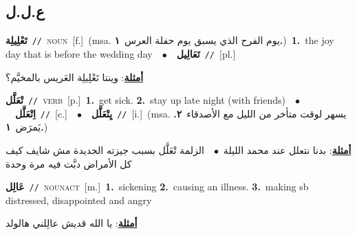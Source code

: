 \documentclass[10pt,a4paper,twoside]{article} %
\begin{document}
\begin{multicols}{2}
\vspace{-3mm}
\subsection*{\color{blue}\foreignlanguage{arabic}{ع.ل.ل}\color{blue}{}} 

{\setlength\topsep{0pt}\textbf{\foreignlanguage{arabic}{تَعْلِيلِة}}\ {\color{gray}\texttt{//}\color{black}}\ \textsc{noun}\ [f.]\ \color{gray}(msa. \foreignlanguage{arabic}{يوم الفرح الذي يسبق يوم حفلة العرس}~\foreignlanguage{arabic}{\textbf{١.}})\color{black}\ \textbf{1.}~the joy day that is before the wedding day\ \ $\bullet$\ \ \setlength\topsep{0pt}\textbf{\foreignlanguage{arabic}{تَعَالِيل}}\ {\color{gray}\texttt{//}\color{black}}\ [pl.]\  \begin{flushright}\color{gray}\foreignlanguage{arabic}{\textbf{\underline{\foreignlanguage{arabic}{أمثلة}}}: وينتا تَعْلِيلِة العَريس بالمخيَّم؟}\end{flushright}\color{black}} \vspace{2mm}

{\setlength\topsep{0pt}\textbf{\foreignlanguage{arabic}{تْعَلَّل}}\ {\color{gray}\texttt{//}\color{black}}\ \textsc{verb}\ [p.]\ \textbf{1.}~get sick.  \textbf{2.}~stay up late night (with friends)\ \ $\bullet$\ \ \setlength\topsep{0pt}\textbf{\foreignlanguage{arabic}{اِتْعَلَّل}}\ {\color{gray}\texttt{//}\color{black}}\ [c.]\ \ $\bullet$\ \ \setlength\topsep{0pt}\textbf{\foreignlanguage{arabic}{يِتْعَلَّل}}\ {\color{gray}\texttt{//}\color{black}}\ [i.]\ \color{gray}(msa. \foreignlanguage{arabic}{يسهر لوقت متأخر من الليل مع الأصدقاء}~\foreignlanguage{arabic}{\textbf{٢.}}  \foreignlanguage{arabic}{يَمرَض}~\foreignlanguage{arabic}{\textbf{١.}})\color{black}\  \begin{flushright}\color{gray}\foreignlanguage{arabic}{\textbf{\underline{\foreignlanguage{arabic}{أمثلة}}}: بدنا نتعلل عند محمد الليلة\ $\bullet$\ \  الزلمة تْعَلَّل بسبب جيزته الجديدة مش شايف كيف كل الأمراض دبَّت فيه مرة وحدة}\end{flushright}\color{black}} \vspace{2mm}

{\setlength\topsep{0pt}\textbf{\foreignlanguage{arabic}{عَالِل}}\ {\color{gray}\texttt{//}\color{black}}\ \textsc{noun\textunderscore act}\ [m.]\ \textbf{1.}~sickening  \textbf{2.}~causing an illness.  \textbf{3.}~making sb distressed, disappointed and angry\  \begin{flushright}\color{gray}\foreignlanguage{arabic}{\textbf{\underline{\foreignlanguage{arabic}{أمثلة}}}: يا الله قديش عالِلني هالولد}\end{flushright}\color{black}} \vspace{2mm}


\end{multicols}
\end{document}
